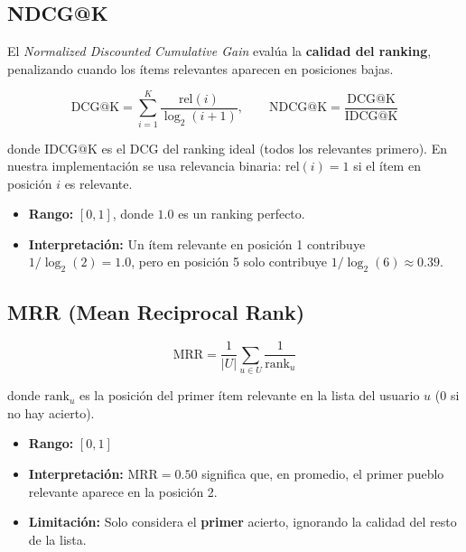 \documentclass[11pt, a4paper]{article}
\begin{document}
\subsection{NDCG@K}

El \textit{Normalized Discounted Cumulative Gain} evalúa la \textbf{calidad del ranking}, penalizando cuando los ítems relevantes aparecen en posiciones bajas.

\begin{equation}
    \text{DCG@K} = \sum_{i=1}^{K} \frac{\text{rel}(i)}{\log_2(i + 1)}, \qquad
    \text{NDCG@K} = \frac{\text{DCG@K}}{\text{IDCG@K}}
\end{equation}

donde $\text{IDCG@K}$ es el DCG del ranking ideal (todos los relevantes primero). En nuestra implementación se usa relevancia binaria: $\text{rel}(i) = 1$ si el ítem en posición $i$ es relevante.

\begin{itemize}
    \item \textbf{Rango:} $[0, 1]$, donde $1.0$ es un ranking perfecto.
    \item \textbf{Interpretación:} Un ítem relevante en posición 1 contribuye $1/\log_2(2) = 1.0$, pero en posición 5 solo contribuye $1/\log_2(6) \approx 0.39$.
\end{itemize}

\subsection{MRR (Mean Reciprocal Rank)}

\begin{equation}
    \text{MRR} = \frac{1}{|U|} \sum_{u \in U} \frac{1}{\text{rank}_u}
\end{equation}

donde $\text{rank}_u$ es la posición del primer ítem relevante en la lista del usuario $u$ (0 si no hay acierto).

\begin{itemize}
    \item \textbf{Rango:} $[0, 1]$
    \item \textbf{Interpretación:} $\text{MRR} = 0.50$ significa que, en promedio, el primer pueblo relevante aparece en la posición 2.
    \item \textbf{Limitación:} Solo considera el \textbf{primer} acierto, ignorando la calidad del resto de la lista.
\end{itemize}
\end{document}
